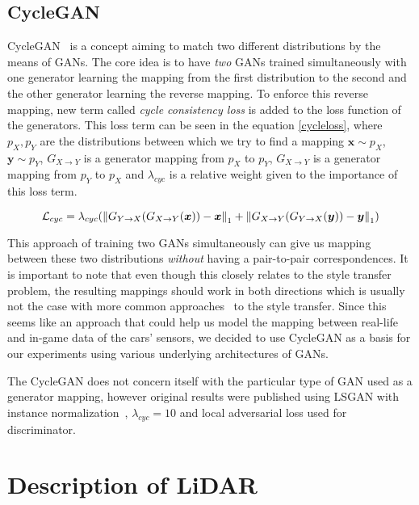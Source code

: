 \subsection{CycleGAN} \label{cyclegan}

CycleGAN~\cite{cyclegan} is a concept aiming to match two different distributions by the means of GANs. The core idea is to have {\em two} GANs trained simultaneously with one generator learning the mapping from the first distribution to the second and the other generator learning the reverse mapping. To enforce this reverse mapping, new term called {\em cycle consistency loss} is added to the loss function of the generators. This loss term can be seen in the equation \ref{cycleloss}, where $p_X, p_Y$ are the distributions between which we try to find a mapping $\bm{x}\sim p_X$, $\bm{y}\sim p_Y$, $G_{X\rightarrow Y}$ is a generator mapping from $p_X$ to $p_Y$, $G_{X\rightarrow Y}$ is a generator mapping from $p_Y$ to $p_X$ and $\lambda_{cyc}$ is a relative weight given to the importance of this loss term.

\begin{equation}
\mathcal{L}_{cyc} = \lambda_{cyc}(\left\lVert G_{Y\rightarrow X}(G_{X\rightarrow Y}(\bm{x})) - \bm{x}\right\rVert_1 + \left\lVert G_{X\rightarrow Y}(G_{Y\rightarrow X}(\bm{y})) - \bm{y}\right\rVert_1)
\label{cycleloss}
\end{equation}

This approach of training two GANs simultaneously can give us mapping between these two distributions {\em without} having a pair-to-pair correspondences. It is important to note that even though this closely relates to the style transfer problem, the resulting mappings should work in both directions which is usually not the case with more common approaches~\cite{artstyle} to the style transfer. Since this seems like an approach that could help us model the mapping between real-life and in-game data of the cars' sensors, we decided to use CycleGAN as a basis for our experiments using various underlying architectures of GANs.

The CycleGAN does not concern itself with the particular type of GAN used as a generator mapping, however original results were published using LSGAN with instance normalization~\cite{instancenorm}, $\lambda_{cyc} = 10$ and local adversarial loss used for discriminator.

\section{Description of LiDAR}

